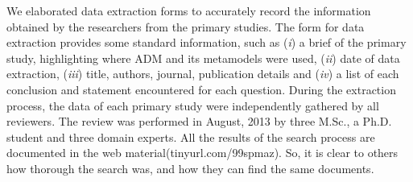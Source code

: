 

We elaborated data extraction forms to accurately record the information obtained by the researchers from the primary studies. The form for data extraction provides some standard information, such as (\textit{i}) a brief of the primary study, highlighting where ADM and its metamodels were used, (\textit{ii}) date of data extraction, (\textit{iii}) title, authors, journal, publication details and (\textit{iv}) a list of each conclusion and statement encountered for each question. During the extraction process, the data of each primary study were independently gathered by all reviewers. The review was performed in August, 2013 by three M.Sc., a Ph.D. student and three domain experts. All the results of the search process are documented in the web material(tinyurl.com/99spmaz). So, it is clear to others how thorough the search was, and how they can find the same documents.

